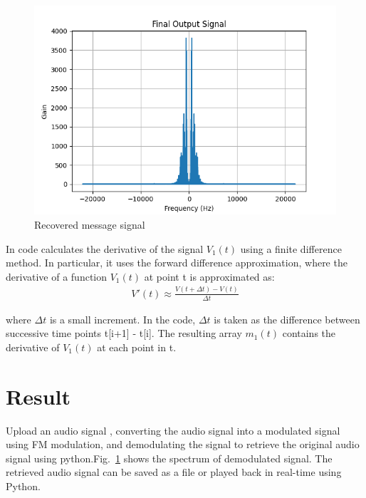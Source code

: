 \documentclass[journal,5pt,twocolumn]{IEEEtran}
\newcommand\figref{Fig.~\ref}
\begin{document}
\begin{enumerate}
\begin{figure}
\centering 
\includegraphics[width=\columnwidth]{../figs/final.png} 
\caption{Recovered message signal}
\label{fig:final}
\end{figure}
\end{enumerate}

In code calculates the derivative of the signal $V_1(t)$ using a finite difference method. In particular, it uses the forward difference approximation, where the derivative of a function $V_1(t)$ at point t is approximated as:
\begin{align}
V'(t) \approx \frac{V(t+\Delta t) - V(t)}{\Delta t}
\end{align}

 where ${\Delta t}$  is a small increment. In the code, ${\Delta t}$ is taken as the difference between successive time points t[i+1] - t[i].
 The resulting array $m_1(t)$  contains  the derivative of $V_1(t)$ at each point in t.

\section{\textbf{Result}}

  Upload an audio signal , converting the audio signal into a modulated signal using FM modulation,  and demodulating the signal to retrieve the original audio signal using python.\figref{fig:final} shows the spectrum of demodulated signal. The retrieved audio signal can be saved as a file or played back in real-time using Python.

\begin{center}
\end{center}
\end{document}
